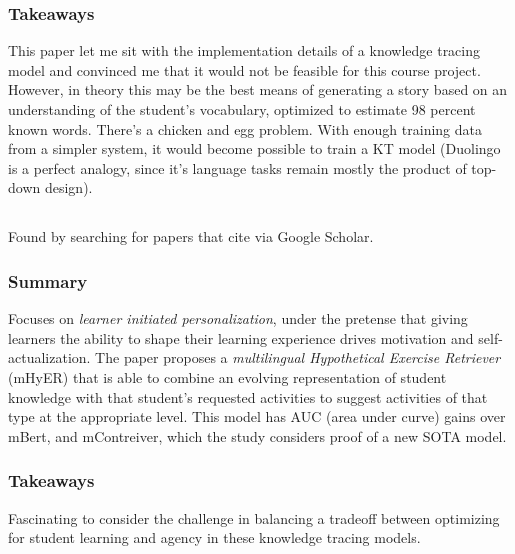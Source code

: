 \documentclass[
	letterpaper, %
]{jdf}
\begin{document}
\subsubsection{Takeaways}
This paper let me sit with the implementation details of a knowledge tracing model and convinced me that it would not be feasible for this course project. However, in theory this may be the best means of generating a story based on an understanding of the student's vocabulary, optimized to estimate 98 percent known words. There's a chicken and egg problem. With enough training data from a simpler system, it would become possible to train a KT model (Duolingo is a perfect analogy, since it's language tasks remain mostly the product of top-down design).

\subsection{}

Found by searching for papers that cite \cite{important_adaptive_learning_exercise_generation} via Google Scholar.

\subsubsection{Summary}
Focuses on \textit{learner initiated personalization}, under the pretense that giving learners the ability to shape their learning experience drives motivation and self-actualization. The paper proposes a \textit{multilingual Hypothetical Exercise Retriever} (mHyER) that is able to combine an evolving representation of student knowledge with that student's requested activities to suggest activities of that type at the appropriate level. This model has AUC (area under curve) gains over mBert, and mContreiver, which the study considers proof of a new SOTA model.

\subsubsection{Takeaways}
Fascinating to consider the challenge in balancing a tradeoff between optimizing for student learning and agency in these knowledge tracing models. 
\end{document}
